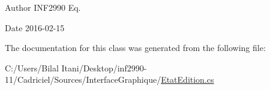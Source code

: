 \begin{DoxyAuthor}{Author}
I\+N\+F2990 Eq. 
\end{DoxyAuthor}
\begin{DoxyDate}{Date}
2016-\/02-\/15 
\end{DoxyDate}


The documentation for this class was generated from the following file\+:\begin{DoxyCompactItemize}
\item 
C\+:/\+Users/\+Bilal Itani/\+Desktop/inf2990-\/11/\+Cadriciel/\+Sources/\+Interface\+Graphique/\hyperlink{_etat_edition_8cs}{Etat\+Edition.\+cs}\end{DoxyCompactItemize}

